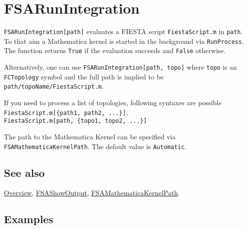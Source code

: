 \documentclass[../FeynHelpersManual.tex]{subfiles}
\begin{document}
\hypertarget{fsarunintegration}{
\section{FSARunIntegration}\label{fsarunintegration}}

\texttt{FSARunIntegration[\allowbreak{}path]} evaluates a FIESTA script
\texttt{FiestaScript.m} in \texttt{path}. To that aim a Mathematica
kernel is started in the background via \texttt{RunProcess}. The
function returns \texttt{True} if the evaluation succeeds and
\texttt{False} otherwise.

Alternatively, one can use
\texttt{FSARunIntegration[\allowbreak{}path,\ \allowbreak{}topo]} where
\texttt{topo} is an \texttt{FCTopology} symbol and the full path is
implied to be \texttt{path/topoName/FiestaScript.m}.

If you need to process a list of topologies, following syntaxes are
possible
\texttt{FiestaScript.m[\allowbreak{}\{\allowbreak{}path1,\ \allowbreak{}path2,\ \allowbreak{}...\}]},
\texttt{FiestaScript.m[\allowbreak{}path,\ \allowbreak{}\{\allowbreak{}topo1,\ \allowbreak{}topo2,\ \allowbreak{}...\}]}

The path to the Mathematica Kernel can be specified via
\texttt{FSAMathematicaKernelPath}. The default value is
\texttt{Automatic}.

\subsection{See also}

\hyperlink{toc}{Overview}, \hyperlink{fsashowoutput}{FSAShowOutput},
\hyperlink{fsamathematicakernelpath}{FSAMathematicaKernelPath}.

\subsection{Examples}
\end{document}
